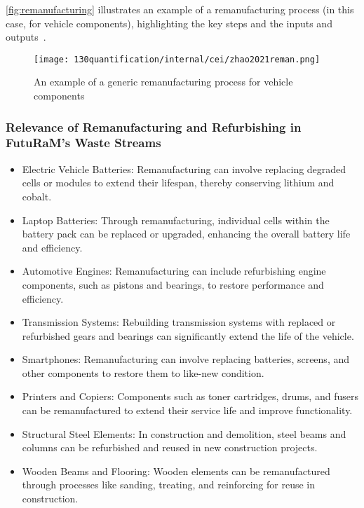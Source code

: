  \autoref{fig:remanufacturing} illustrates an example of a remanufacturing process (in this case, for vehicle components), highlighting the key steps and the inputs and outputs~\cite{zhao2021reman}.

\begin{figure}[ht!]
    \centering
    \texttt{[image: 130quantification/internal/cei/zhao2021reman.png]}
    \caption[An example of a generic remanufacturing process for vehicle components]{An example of a generic remanufacturing process for vehicle components~\cite{zhao2021reman}}
    \label{fig:remanufacturing}
\end{figure}
\FloatBarrier
\sectionEndlines
\clearpage


\subsubsection{Relevance of Remanufacturing and Refurbishing in FutuRaM's Waste Streams}

\wasteSubsubsecBATT
\begin{itemize}
    \item Electric Vehicle Batteries: Remanufacturing can involve replacing degraded cells or modules to extend their lifespan, thereby conserving lithium and cobalt.
    \item Laptop Batteries: Through remanufacturing, individual cells within the battery pack can be replaced or upgraded, enhancing the overall battery life and efficiency.
\end{itemize}

\wasteSubsubsecELV
\begin{itemize}
    \item Automotive Engines: Remanufacturing can include refurbishing engine components, such as pistons and bearings, to restore performance and efficiency.
    \item Transmission Systems: Rebuilding transmission systems with replaced or refurbished gears and bearings can significantly extend the life of the vehicle.
\end{itemize}

\wasteSubsubsecWEEE
\begin{itemize}
    \item Smartphones: Remanufacturing can involve replacing batteries, screens, and other components to restore them to like-new condition.
    \item Printers and Copiers: Components such as toner cartridges, drums, and fusers can be remanufactured to extend their service life and improve functionality.
\end{itemize}

\wasteSubsubsecCDW
\begin{itemize}
    \item Structural Steel Elements: In construction and demolition, steel beams and columns can be refurbished and reused in new construction projects.
    \item Wooden Beams and Flooring: Wooden elements can be remanufactured through processes like sanding, treating, and reinforcing for reuse in construction.
\end{itemize}


\sectionEndlines
\clearpage
